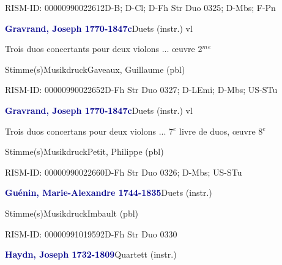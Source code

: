 \documentclass[twocolumn]{book}
\begin{document}
\par RISM-ID: 00000990022612\newline D-B; D-Cl; D-Fh  Str Duo 0325; D-Mbs; F-Pn
\par \vspace{7pt} \textcolor{darkblue}{\textbf{Gravrand, Joseph  1770-1847c}}\hfillplus{\textbf{[280]}}\newline Duets (instr.) vl
\par \begin{itshape}Trois duos concertants pour deux violons ... œuvre 2$^m$$^e$\end{itshape} 
\par \textcolor{darkblue}{}  Stimme(s)\newline Musikdruck\newline Gaveaux, Guillaume  (pbl)
\par RISM-ID: 00000990022652\newline D-Fh  Str Duo 0327; D-LEmi; D-Mbs; US-STu
\par \vspace{7pt} \textcolor{darkblue}{\textbf{Gravrand, Joseph  1770-1847c}}\hfillplus{\textbf{[281]}}\newline Duets (instr.) vl
\par \begin{itshape}Trois duos concertans pour deux violons ... 7$^e$ livre de duos, œuvre 8$^e$\end{itshape} 
\par \textcolor{darkblue}{}  Stimme(s)\newline Musikdruck\newline Petit, Philippe  (pbl)
\par RISM-ID: 00000990022660\newline D-Fh  Str Duo 0326; D-Mbs; US-STu
\par \vspace{7pt} \textcolor{darkblue}{\textbf{Guénin, Marie-Alexandre  1744-1835}}\hfillplus{\textbf{[282]}}\newline Duets (instr.)
\par \textcolor{darkblue}{}  Stimme(s)\newline Musikdruck\newline Imbault  (pbl)
\par RISM-ID: 00000991019592\newline D-Fh  Str Duo 0330
\par \vspace{7pt} \textcolor{darkblue}{\textbf{Haydn, Joseph  1732-1809}}\hfillplus{\textbf{[283]}}\newline Quartett (instr.)
\end{document}
